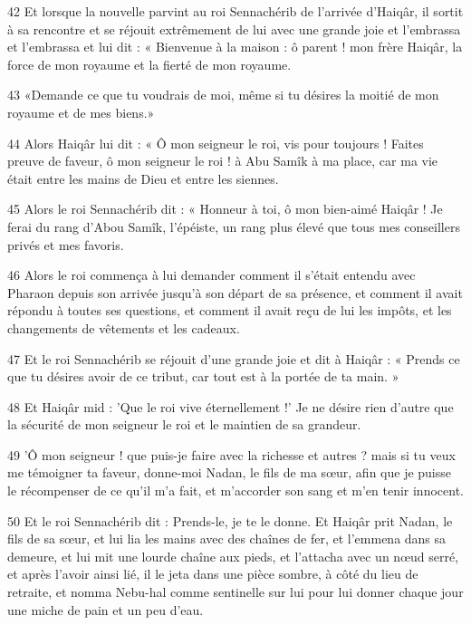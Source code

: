 \par 42 Et lorsque la nouvelle parvint au roi Sennachérib de l'arrivée d'Haiqâr, il sortit à sa rencontre et se réjouit extrêmement de lui avec une grande joie et l'embrassa et l'embrassa et lui dit : « Bienvenue à la maison : ô parent ! mon frère Haiqâr, la force de mon royaume et la fierté de mon royaume.

\par 43 «Demande ce que tu voudrais de moi, même si tu désires la moitié de mon royaume et de mes biens.»

\par 44 Alors Haiqâr lui dit : « Ô mon seigneur le roi, vis pour toujours ! Faites preuve de faveur, ô mon seigneur le roi ! à Abu Samîk à ma place, car ma vie était entre les mains de Dieu et entre les siennes.

\par 45 Alors le roi Sennachérib dit : « Honneur à toi, ô mon bien-aimé Haiqâr ! Je ferai du rang d'Abou Samîk, l'épéiste, un rang plus élevé que tous mes conseillers privés et mes favoris.

\par 46 Alors le roi commença à lui demander comment il s'était entendu avec Pharaon depuis son arrivée jusqu'à son départ de sa présence, et comment il avait répondu à toutes ses questions, et comment il avait reçu de lui les impôts, et les changements de vêtements et les cadeaux.

\par 47 Et le roi Sennachérib se réjouit d'une grande joie et dit à Haiqâr : « Prends ce que tu désires avoir de ce tribut, car tout est à la portée de ta main. »

\par 48 Et Haiqâr mid : 'Que le roi vive éternellement !' Je ne désire rien d'autre que la sécurité de mon seigneur le roi et le maintien de sa grandeur.

\par 49 'Ô mon seigneur ! que puis-je faire avec la richesse et autres ? mais si tu veux me témoigner ta faveur, donne-moi Nadan, le fils de ma sœur, afin que je puisse le récompenser de ce qu'il m'a fait, et m'accorder son sang et m'en tenir innocent.

\par 50 Et le roi Sennachérib dit : Prends-le, je te le donne. Et Haiqâr prit Nadan, le fils de sa sœur, et lui lia les mains avec des chaînes de fer, et l'emmena dans sa demeure, et lui mit une lourde chaîne aux pieds, et l'attacha avec un nœud serré, et après l'avoir ainsi lié, il le jeta dans une pièce sombre, à côté du lieu de retraite, et nomma Nebu-hal comme sentinelle sur lui pour lui donner chaque jour une miche de pain et un peu d'eau.

